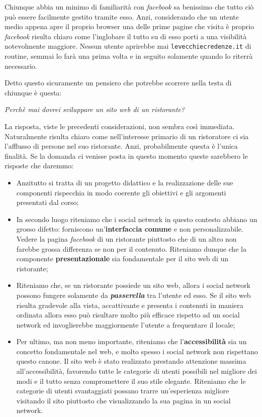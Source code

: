 Chiunque abbia un minimo di familiarità con \textit{facebook} sa benissimo che tutto ciò può essere facilmente gestito tramite esso. Anzi, considerando che un utente medio appena apre il proprio browser una delle prime pagine che visita è proprio \textit{facebook} risulta chiaro come l'inglobare il tutto su di esso porti a una visibilità notevolmente maggiore. Nessun utente aprirebbe mai \texttt{levecchiecredenze.it} di routine, semmai lo farà una prima volta e in seguito solamente quando lo riterrà necessario.

Detto questo sicuramente un pensiero che potrebbe scorrere nella testa di chiunque è questa:

\begin{center}

\textit{Perchè mai dovrei sviluppare un sito web di un ristorante?}

\end{center}

La risposta, viste le precedenti considerazioni, non sembra così immediata. Naturalmente risulta chiaro come nell'interesse primario di un ristoratore ci sia l'afflusso di persone nel suo ristorante. Anzi, probabilmente questa è l'unica finalità. Se la domanda ci venisse posta in questo momento queste sarebbero le risposte che daremmo:

\begin{itemize}

	\item Anzitutto si tratta di un progetto didattico e la realizzazione delle sue componenti rispecchia in modo coerente gli obiettivi e gli argomenti presentati dal corso;
	\item In secondo luogo riteniamo che i social network in questo contesto abbiano un grosso difetto: forniscono un'\textbf{interfaccia comune} e non personalizzabile. Vedere la pagina \textit{facebook} di un ristorante piuttosto che di un altro non farebbe grossa differenza se non per il contenuto. Riteniamo dunque che la componente \textbf{presentazionale} sia fondamentale per il sito web di un ristorante;
	\item Riteniamo che, se un ristorante possiede un sito web, allora i social network possono fungere solamente da \textbf{\textit{passerella}} tra l'utente ed esso. Se il sito web risulta gradevole alla vista, accattivante e presenta i contenuti in maniera ordinata allora esso può risultare molto più efficace rispetto ad un social network ed invoglierebbe maggiormente l'utente a frequentare il locale;
	\item Per ultimo, ma non meno importante, riteniamo che l'\textbf{accessibilità} sia un concetto fondamentale nel web, e molto spesso i social network non rispettano questo canone. Il sito web è stato realizzato prestando attenzione massima all'accessibilità, favorendo tutte le categorie di utenti possibili nel migliore dei modi e il tutto senza compromettere il suo stile elegante. Riteniamo che le categorie di utenti svantaggiati possano trarre un'esperienza migliore visitando il sito piuttosto che visualizzando la sua pagina in un social network.
	
\end{itemize}

